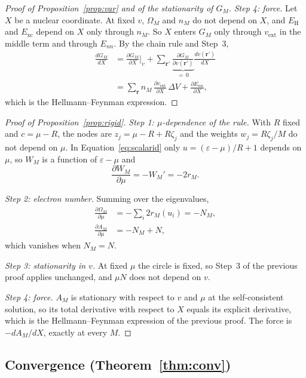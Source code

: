 \documentclass[aps,prb,twocolumn,superscriptaddress,floatfix,longbibliography]{revtex4-2}
\theoremstyle{remark}
\begin{document}
\begin{proof}[Proof of Proposition~\ref{prop:var} and of the stationarity of $G_M$]
\emph{Step 4: force.} Let $X$ be a nuclear coordinate. At fixed $v$, $\Omega_M$ and $n_M$ do not depend on $X$, and $E_\mathrm H$ and
$E_\mathrm{xc}$ depend on $X$ only through $n_M$. So $X$ enters $G_M$ only through $v_\mathrm{ext}$ in the middle term and
through $E_{nn}$. By the chain rule and Step~3,
\begin{align}
\frac{dG_M}{dX}
&=\frac{\partial G_M}{\partial X}\Big|_v+\sum_{\bm r'}\underbrace{\frac{\partial G_M}{\partial v(\bm r')}}_{=\,0}\frac{dv(\bm r')}{dX}\nonumber\\
&=\sum_{\bm r}n_M\,\frac{\partial v_\mathrm{ext}}{\partial X}\,\Delta V+\frac{\partial E_{nn}}{\partial X},
\end{align}
which is the Hellmann--Feynman expression.
\end{proof}

\begin{proof}[Proof of Proposition~\ref{prop:rigid}]
\emph{Step 1: $\mu$-dependence of the rule.} With $R$ fixed and $c=\mu-R$, the nodes are $z_j=\mu-R+R\zeta_j$ and the
weights $w_j=R\zeta_j/M$ do not depend on $\mu$. In Equation~\eqref{eq:scalarid} only $u=(\varepsilon-\mu)/R+1$ depends on $\mu$, so
$W_M$ is a function of $\varepsilon-\mu$ and
\begin{equation}
\frac{\partial W_M}{\partial\mu}=-W_M'=-2r_M .
\end{equation}

\emph{Step 2: electron number.} Summing over the eigenvalues,
\begin{align}
\frac{\partial\Omega_M}{\partial\mu}&=-\sum_i2r_M(u_i)=-N_M,\\
\frac{\partial A_M}{\partial\mu}&=-N_M+N,
\end{align}
which vanishes when $N_M=N$.

\emph{Step 3: stationarity in $v$.} At fixed $\mu$ the circle is fixed, so Step~3 of the previous proof applies unchanged, and
$\mu N$ does not depend on $v$.

\emph{Step 4: force.} $A_M$ is stationary with respect to $v$ and $\mu$ at the self-consistent solution, so its total
derivative with respect to $X$ equals its explicit derivative, which is the Hellmann--Feynman expression of the previous
proof. The force is $-dA_M/dX$, exactly at every $M$.
\end{proof}

\subsection{Convergence (Theorem~\ref{thm:conv})}
\end{document}
